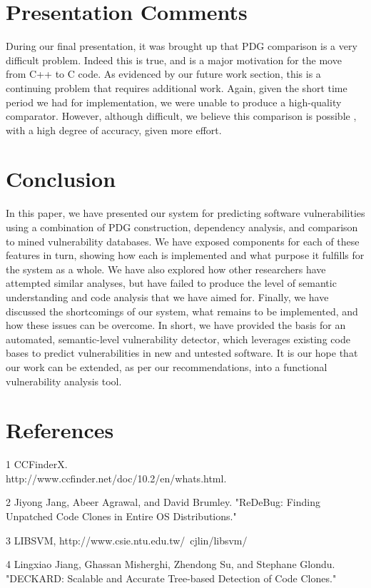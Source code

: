 \documentclass{acm_proc_article-sp}
\begin{document}
\section{Presentation Comments}
During our final presentation, it was brought up that PDG comparison is a very 
difficult problem. Indeed this is true, and is a major motivation for the move 
from C++ to C code. As evidenced by our future work section, this is a 
continuing problem that requires additional work. Again, given the short time 
period we had for implementation, we were unable to produce a high-quality 
comparator. However, although difficult, we believe this comparison is possible
, with a high degree of accuracy, given more effort.

\section{Conclusion}
In this paper, we have presented our system for predicting software 
vulnerabilities using a combination of PDG construction, dependency analysis, 
and comparison to mined vulnerability databases. We have exposed components for 
each of these features in turn, showing how each is implemented and what 
purpose it fulfills for the system as a whole. We have also explored how other 
researchers have attempted similar analyses, but have failed to produce the 
level of semantic understanding and code analysis that we have aimed for. 
Finally, we have discussed the shortcomings of our system, what remains to be 
implemented, and how these issues can be overcome. In short, we have provided 
the basis for an automated, semantic-level vulnerability detector, which 
leverages existing code bases to predict vulnerabilities in new and untested 
software. It is our hope that our work can be extended, as per our 
recommendations, into a functional vulnerability analysis tool.

\section{References}
1 CCFinderX. \\
http://www.ccfinder.net/doc/10.2/en/whats.html.

2 Jiyong Jang, Abeer Agrawal, and David Brumley. "ReDeBug: Finding Unpatched 
Code Clones in Entire OS Distributions."

3 LIBSVM, http://www.csie.ntu.edu.tw/~cjlin/libsvm/

4 Lingxiao Jiang, Ghassan Misherghi, Zhendong Su, and Stephane Glondu. 
"DECKARD: Scalable and Accurate Tree-based Detection of Code Clones."
\end{document}
